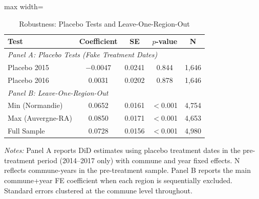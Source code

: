 \begin{table}[htbp]
\centering
\caption{Robustness: Placebo Tests and Leave-One-Region-Out}
\label{tab:robustness}
\begin{adjustbox}{max width=\textwidth}
\begin{tabular}{lcccc}
\toprule
Test & Coefficient & SE & $p$-value & N \\
\midrule
\multicolumn{5}{l}{\textit{Panel A: Placebo Tests (Fake Treatment Dates)}} \\
Placebo 2015 & $-$0.0047 & 0.0241 & 0.844 & 1,646 \\
Placebo 2016 & 0.0031 & 0.0202 & 0.878 & 1,646 \\
\midrule
\multicolumn{5}{l}{\textit{Panel B: Leave-One-Region-Out}} \\
Min (Normandie) & 0.0652 & 0.0161 & $<$0.001 & 4,754 \\
Max (Auvergne-RA) & 0.0850 & 0.0171 & $<$0.001 & 4,653 \\
Full Sample & 0.0728 & 0.0156 & $<$0.001 & 4,980 \\
\bottomrule
\end{tabular}
\end{adjustbox}
\par \raggedright \small
\textit{Notes:} Panel A reports DiD estimates using placebo treatment dates in the pre-treatment period (2014--2017 only) with commune and year fixed effects. N reflects commune-years in the pre-treatment sample. Panel B reports the main commune+year FE coefficient when each region is sequentially excluded. Standard errors clustered at the commune level throughout.
\end{table}
